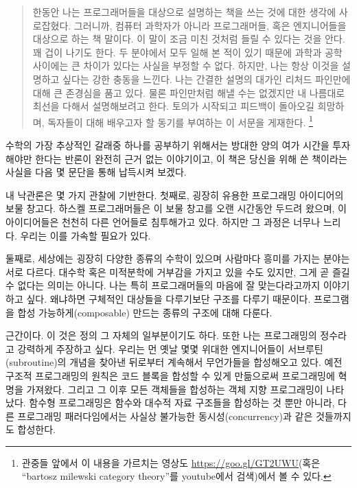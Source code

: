 
\begin{quote}
한동안 나는 프로그래머들을 대상으로 \trCategoryTheory\을 설명하는 책을 쓰는 것에 대한 생각에 사로잡혔다. 
그러니까, 컴퓨터 과학자가 아니라 프로그래머들, 혹은 엔지니어들을 대상으로 하는 책 말이다.
이 말이 조금 미친 것처럼 들릴 수 있다는 것을 안다. 꽤 겁이 나기도 한다.
두 분야에서 모두 일해 본 적이 있기 때문에 과학과 공학 사이에는 큰 차이가 있다는 사실을 부정할 수 없다.
하지만, 나는 항상 이것을 설명하고 싶다는 강한 충동을 느낀다. 나는 간결한 설명의 대가인 리처드 파인만에 대해 큰 존경심을 품고 있다.
물론 파인만처럼 해낼 수는 없겠지만 내 나름대로 최선을 다해서 설명해보려고 한다.
토의가 시작되고 피드백이 돌아오길 희망하며, 독자들이  대해 배우고자 할 동기를 부여하는 이 서문을 게재한다.
\footnote{
관중들 앞에서 이 내용을 가르치는 영상도 \href{https://goo.gl/GT2UWU}{https://goo.gl/GT2UWU}(혹은 ``bartosz milewski category theory''를 youtube에서 검색)에서 볼 수 있다.}
\end{quote}

수학의 가장 추상적인 갈래중 하나를 공부하기 위해서는 방대한 양의 여가 시간을 투자해야만 한다는 반론이 완전히 근거 없는 이야기이고,
이 책은 당신을 위해 쓴 책이라는 사실을 다음 몇 문단을 통해 납득시켜 보겠다.

내 낙관론은 몇 가지 관찰에 기반한다. 첫째로, \trCategoryTheory\는 굉장히 유용한 프로그래밍 아이디어의 보물 창고다.
하스켈 프로그래머들은 이 보물 창고를 오랜 시간동안 두드려 왔으며, 이 아이디어들은 천천히 다른 언어들로 침투해가고 있다.
하지만 그 과정은 너무나 느리다. 우리는 이를 가속할 필요가 있다.

둘째로, 세상에는 굉장히 다양한 종류의 수학이 있으며 사람마다 흥미를 가지는 분야는 서로 다르다.
대수학 혹은 미적분학에 거부감을 가지고 있을 수도 있지만, 그게 곧 \trCategoryTheory\를 즐길 수 없다는 의미는 아니다.
나는 \trCategoryTheory\는 특히 프로그래머들의 마음에 잘 맞는다라고까지 이야기하고 싶다. 왜냐하면 \trCategoryTheory\는 구체적인 대상들을 다루기보단 구조를 다루기 때문이다.
\trCategoryTheory\는 프로그램을 합성 가능하게(composable) 만드는 종류의 구조에 대해 다룬다.

\trComposition\은  근간이다. 이 것은  정의 그 자체의 일부분이기도 하다.
또한 나는  프로그래밍의 정수라고 강력하게 주장하고 싶다.
우리는 먼 옛날 몇몇 위대한 엔지니어들이 서브루틴(subroutine)의 개념을 찾아낸 뒤로부터 계속해서 무언가들을 합성해오고 있다.
예전 구조적 프로그래밍의 원칙은 코드 블록을 합성할 수 있게 만듦으로써 프로그래밍에 혁명을 가져왔다.
그리고 그 이후 모든 객체들을 합성하는 객체 지향 프로그래밍이 나타났다.
함수형 프로그래밍은 함수와 대수적 자료 구조들을 합성하는 것 뿐만 아니라, 다른 프로그래밍 패러다임에서는 사실상 불가능한 동시성(concurrency)과 같은 것들까지도 합성한다.

